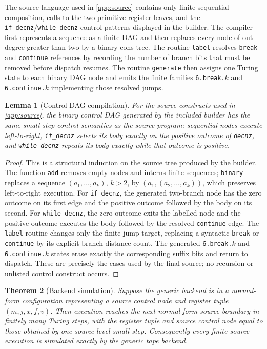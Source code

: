 \documentclass[10pt]{article}
\newtheorem{theorem}{Theorem}[section]
\newtheorem{lemma}[theorem]{Lemma}
\theoremstyle{definition}
\begin{document}
The source language used in \cref{app:source} contains only finite sequential
composition, calls to the two primitive register leaves, and the
\texttt{if\_decnz}/\texttt{while\_decnz} control patterns displayed in the
builder.  The compiler first represents a sequence as a finite DAG and then
replaces every node of out-degree greater than two by a binary cons tree.
The routine \texttt{label} resolves \texttt{break} and \texttt{continue}
references by recording the number of branch bits that must be removed before
dispatch resumes.  The routine \texttt{generate}
then assigns one Turing state to each binary DAG node and emits the finite
families \texttt{6.break.$k$} and \texttt{6.continue.$k$} implementing those
resolved jumps.

\begin{lemma}[Control-DAG compilation]
\label{lem:controldag}
For the source constructs used in \cref{app:source}, the binary control DAG
generated by the included builder has the same small-step control semantics as
the source program: sequential nodes execute left-to-right,
\texttt{if\_decnz} selects its body exactly on the positive outcome of
\texttt{decnz}, and \texttt{while\_decnz} repeats its body exactly while that
outcome is positive.
\end{lemma}

\begin{proof}
This is a structural induction on the source tree produced by the builder.
The function \texttt{add} removes empty nodes and interns finite sequences;
\texttt{binary} replaces a sequence $(a_1,\ldots,a_k)$, $k>2$, by
$(a_1,(a_2,\ldots,a_k))$, which preserves left-to-right execution.
For \texttt{if\_decnz}, the generated two-branch node has the zero outcome on
its first edge and the positive outcome followed by the body on its second.
For \texttt{while\_decnz}, the zero outcome exits the labelled node and the
positive outcome executes the body followed by the resolved
\texttt{continue} edge.  The \texttt{label} routine changes only the finite
jump target, replacing a syntactic \texttt{break} or \texttt{continue} by its
explicit branch-distance count.  The generated \texttt{6.break.$k$} and
\texttt{6.continue.$k$} states erase exactly the corresponding suffix bits and
return to dispatch.  These are precisely the cases used by the final source;
no recursion or unlisted control construct occurs.
\end{proof}

\begin{theorem}[Backend simulation]
\label{thm:backend}
Suppose the generic backend is in a normal-form configuration representing a
source control node and register tuple $(m,j,x,f,v)$.  Then execution reaches
the next normal-form source boundary in finitely many Turing steps, with the
register tuple and source control node equal to those obtained by one
source-level small step.  Consequently every finite source execution is
simulated exactly by the generic tape backend.
\end{theorem}
\end{document}
